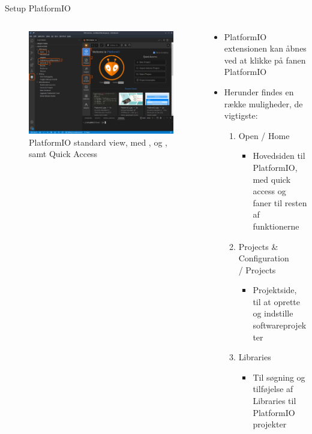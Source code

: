 \documentclass[aspectratio=169]{beamer}
\begin{document}
\begin{frame}{Setup PlatformIO}
\begin{columns}
	\begin{column}{0.5\textwidth}
		\begin{figure}
  			\includegraphics[width=\textwidth,keepaspectratio=true]{assets/pictures/pio-menu.png}
  			\caption{PlatformIO standard view, med ,  og , samt Quick Access}
  			\label{fig:pio-menu}
		\end{figure}
	\end{column}
	\begin{column}{0.5\textwidth}
		\begin{textBox}
			\begin{itemize}
				\item PlatformIO extensionen kan åbnes ved at klikke på fanen PlatformIO 
				\item Herunder findes en række muligheder, de vigtigste:
				\begin{enumerate}
					\item Open / Home
					\begin{itemize}
						\item Hovedsiden til PlatformIO, med quick access og faner til resten af funktionerne
					\end{itemize}
					\item Projects \& Configuration \\/ Projects
					\begin{itemize}
						\item Projektside, til at oprette og indstille softwareprojekter
					\end{itemize}
					\item Libraries
					\begin{itemize}
						\item Til søgning og tilføjelse af Libraries til PlatformIO projekter
					\end{itemize}
				\end{enumerate}
			\end{itemize}
		\end{textBox}
	\end{column}
\end{columns}
\end{frame}
\end{document}
